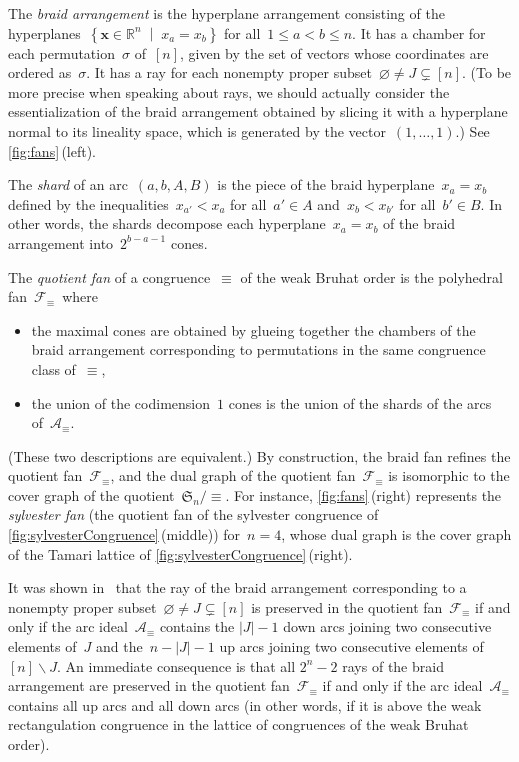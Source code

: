 \documentclass{amsart}
\theoremstyle{definition}
\newcommand{\R}{\mathbb{R}} %
\renewcommand{\c}[1]{\mathcal{#1}} %
\renewcommand{\b}[1]{{\boldsymbol{#1}}} %
\newcommand{\f}[1]{\mathfrak{#1}} %
\newcommand{\set}[2]{\left\{ #1 \;\middle|\; #2 \right\}} %
\newcommand{\ssm}{\smallsetminus} %
\newcommand{\eqdef}{\mbox{\,\raisebox{0.2ex}{\scriptsize\ensuremath{\mathrm:}}\ensuremath{=}\,}} %
\newcommand{\darkblue}{\color{darkblue}} %
\newcommand{\defn}[1]{\textsl{\darkblue #1}} %
\begin{document}
The \defn{braid arrangement} is the hyperplane arrangement consisting of the hyperplanes~$\set{\b{x} \in \R^n}{x_a = x_b}$ for all~$1 \le a < b \le n$.
It has a chamber for each permutation~$\sigma$ of~$[n]$, given by the set of vectors whose coordinates are ordered as~$\sigma$.
It has a ray for each nonempty proper subset~$\varnothing \ne J \subsetneq [n]$.
(To be more precise when speaking about rays, we should actually consider the essentialization of the braid arrangement obtained by slicing it with a hyperplane normal to its lineality space, which is generated by the vector~$(1, \dots, 1)$.)
See \cref{fig:fans}\,(left).

The \defn{shard} of an arc~$(a, b, A, B)$ is the piece of the braid hyperplane~${x_a = x_b}$ defined by the inequalities~$x_{a'} < x_a$ for all~$a' \in A$ and~$x_b < x_{b'}$ for all~$b' \in B$.
In other words, the shards decompose each hyperplane~$x_a = x_b$ of the braid arrangement into~$2^{b-a-1}$ cones.

The \defn{quotient fan} of a congruence~$\equiv$ of the weak Bruhat order is the polyhedral fan~$\c{F}_\equiv$~where
\begin{itemize}
\item the maximal cones are obtained by glueing together the chambers of the braid arrangement corresponding to permutations in the same congruence class of~$\equiv$,
\item the union of the codimension~$1$ cones is the union of the shards of the arcs of~$\c{A}_\equiv$.
\end{itemize}
(These two descriptions are equivalent.)
By construction, the braid fan refines the quotient fan~$\c{F}_\equiv$, and the dual graph of the quotient fan~$\c{F}_\equiv$ is isomorphic to the cover graph of the quotient~$\f{S}_n/{\equiv}$.
For instance, \cref{fig:fans}\,(right) represents the \defn{sylvester fan} (the quotient fan of the sylvester congruence of \cref{fig:sylvesterCongruence}\,(middle)) for~$n = 4$, whose dual graph is the cover graph of the Tamari lattice of \cref{fig:sylvesterCongruence}\,(right).

It was shown in~\cite[Lem.~23]{AlbertinPilaudRitter} that the ray of the braid arrangement corresponding to a nonempty proper subset~$\varnothing \ne J \subsetneq [n]$ is preserved in the quotient fan~$\c{F}_\equiv$ if and only if the arc ideal~$\c{A}_\equiv$ contains the $|J|-1$ down arcs joining two consecutive elements of~$J$ and the~$n-|J|-1$ up arcs joining two consecutive elements of~$[n] \ssm J$.
An immediate consequence is that all $2^n-2$ rays of the braid arrangement are preserved in the quotient fan~$\c{F}_\equiv$ if and only if the arc ideal~$\c{A}_\equiv$ contains all up arcs and all down arcs (in other words, if it is above the weak rectangulation congruence in the lattice of congruences of the weak Bruhat order).
\end{document}

